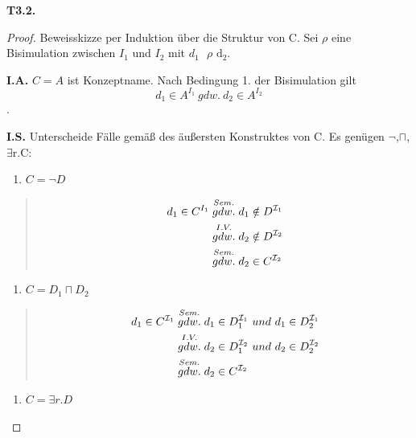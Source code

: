 \textbf{T3.2.}

\begin{proof}
Beweisskizze per Induktion über die Struktur von C. Sei $\rho$ eine
Bisimulation zwischen $I_{1}$ und $I_{2}$ mit
$d_{1}\text{\ $\rho$}\text{\ d}_{2}$.

\textbf{I.A.} $C = A$ ist Konzeptname. Nach Bedingung 1. der
Bisimulation gilt $$d_{1} \in A^{I_{1}}\ gdw.\ d_{2} \in A^{I_{2}}$$.

\textbf{I.S.} Unterscheide Fälle gemäß des äußersten Konstruktes von C.
Es genügen $\neg$,$\sqcap$, $\exists\text{r.C}$:

\begin{enumerate}
\def\labelenumi{\arabic{enumi}.}
\item
  $C = \neg D$
\end{enumerate}

\begin{quote}
\begin{equation}
\begin{split}
d_{1} \in C^{I_{1}} &\stackrel{Sem.}{gdw.} d_{1} \notin D^{\mathcal{I}_{1}}\\
&\stackrel{I.V.}{gdw.} d_{2} \notin D^{\mathcal{I}_{2}} \\
&\stackrel{Sem.}{gdw.} d_{2} \in C^{\mathcal{I}_{2}}
\end{split}
\end{equation}
\end{quote}

\begin{enumerate}
\def\labelenumi{\arabic{enumi}.}
\item
  $C = D_{1} \sqcap D_{2}$
\end{enumerate}

\begin{quote}
\begin{equation}
\begin{split}
d_{1} \in C^{\mathcal{I}_{1}} &\stackrel{Sem.}{gdw.} d_{1} \in D_{1}^{\mathcal{I}_{1}}\ und\ d_{1} \in D_{2}^{\mathcal{I}_{1}}\\
&\stackrel{I.V.}{gdw.} d_{2} \in D_{1}^{\mathcal{I}_{2}}\ und\ d_{2} \in D_{2}^{\mathcal{I}_{2}} \\
&\stackrel{Sem.}{gdw.} d_{2} \in C^{\mathcal{I}_{2}}
\end{split}
\end{equation}
\end{quote}

\begin{enumerate}
\def\labelenumi{\arabic{enumi}.}
\item
  $C = \exists r.D$
\end{enumerate}


\end{proof}
